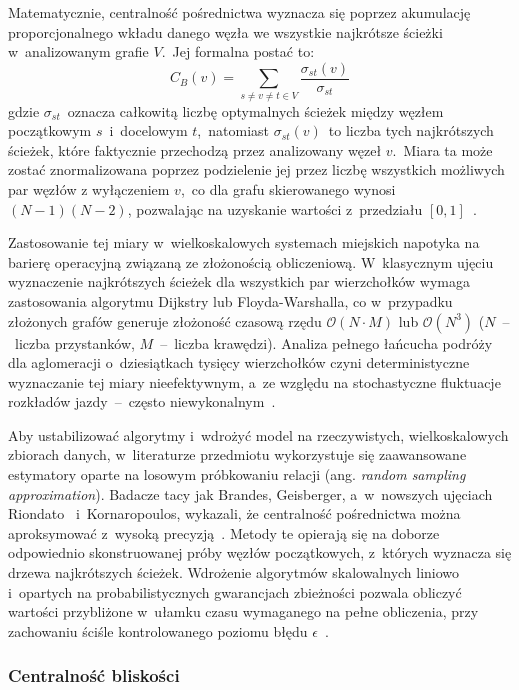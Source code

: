 \documentclass{pracamgr}
\begin{document}
Matematycznie, centralność pośrednictwa wyznacza się poprzez akumulację proporcjonalnego wkładu danego węzła we wszystkie najkrótsze ścieżki w~analizowanym grafie $V$.~Jej formalna postać to:
$$C_B(v) = \sum_{s \neq v \neq t \in V} \frac{\sigma_{st}(v)}{\sigma_{st}}$$ 
gdzie $\sigma_{st}$~oznacza całkowitą liczbę optymalnych ścieżek między węzłem początkowym $s$~i~docelowym $t$,~natomiast $\sigma_{st}(v)$~to liczba tych najkrótszych ścieżek, które faktycznie przechodzą przez analizowany węzeł $v$.~Miara ta może zostać znormalizowana poprzez podzielenie jej przez liczbę wszystkich możliwych par węzłów z wyłączeniem $v$,~co dla grafu skierowanego wynosi $(N-1)(N-2)$, pozwalając na uzyskanie wartości z~przedziału $[0, 1]$~\cite{wiki:betweenness}.

Zastosowanie tej miary w~wielkoskalowych systemach miejskich napotyka na barierę operacyjną związaną ze złożonością obliczeniową. W~klasycznym ujęciu wyznaczenie najkrótszych ścieżek dla wszystkich par wierzchołków wymaga zastosowania algorytmu Dijkstry lub Floyda-Warshalla, co w~przypadku złożonych grafów generuje złożoność czasową rzędu $\mathcal O(N \cdot M)$ lub $\mathcal O(N^3)$ ($N$~–~liczba przystanków, $M$~–~liczba krawędzi). Analiza pełnego łańcucha podróży dla aglomeracji o~dziesiątkach tysięcy wierzchołków czyni deterministyczne wyznaczanie tej miary nieefektywnym, a~ze względu na stochastyczne fluktuacje rozkładów jazdy~–~często niewykonalnym~\cite{centrality}.

Aby ustabilizować algorytmy i~wdrożyć model na rzeczywistych, wielkoskalowych zbiorach danych, w~literaturze przedmiotu wykorzystuje się zaawansowane estymatory oparte na losowym próbkowaniu relacji (ang. \textit{random sampling approximation}). Badacze tacy jak Brandes, Geisberger, a~w~nowszych ujęciach Riondato~\cite{centrality} i~Kornaropoulos, wykazali, że centralność pośrednictwa można aproksymować z~wysoką precyzją~\cite{graph}. Metody te opierają się na doborze odpowiednio skonstruowanej próby węzłów początkowych, z~których wyznacza się drzewa najkrótszych ścieżek. Wdrożenie algorytmów skalowalnych liniowo i~opartych na probabilistycznych gwarancjach zbieżności pozwala obliczyć wartości przybliżone w~ułamku czasu wymaganego na pełne obliczenia, przy zachowaniu ściśle kontrolowanego poziomu błędu $\epsilon$~\cite{centrality}. 

\subsubsection{Centralność bliskości}
\end{document}
